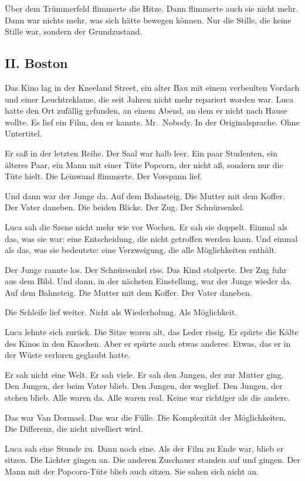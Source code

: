 \documentclass[
  ngerman,
]{article}
\begin{document}
Über dem Trümmerfeld flimmerte die Hitze. Dann flimmerte auch sie nicht
mehr. Dann war nichts mehr, was sich hätte bewegen können. Nur die
Stille, die keine Stille war, sondern der Grundzustand.

\subsection{II. Boston}\label{ii.-boston}

Das Kino lag in der Kneeland Street, ein alter Bau mit einem verbeulten
Vordach und einer Leuchtreklame, die seit Jahren nicht mehr repariert
worden war. Luca hatte den Ort zufällig gefunden, an einem Abend, an dem
er nicht nach Hause wollte. Es lief ein Film, den er kannte. Mr.~Nobody.
In der Originalsprache. Ohne Untertitel.

Er saß in der letzten Reihe. Der Saal war halb leer. Ein paar Studenten,
ein älteres Paar, ein Mann mit einer Tüte Popcorn, der nicht aß, sondern
nur die Tüte hielt. Die Leinwand flimmerte. Der Vorspann lief.

Und dann war der Junge da. Auf dem Bahnsteig. Die Mutter mit dem Koffer.
Der Vater daneben. Die beiden Blicke. Der Zug. Der Schnürsenkel.

Luca sah die Szene nicht mehr wie vor Wochen. Er sah sie doppelt. Einmal
als das, was sie war: eine Entscheidung, die nicht getroffen werden
kann. Und einmal als das, was sie bedeutete: eine Verzweigung, die alle
Möglichkeiten enthält.

Der Junge rannte los. Der Schnürsenkel riss. Das Kind stolperte. Der Zug
fuhr aus dem Bild. Und dann, in der nächsten Einstellung, war der Junge
wieder da. Auf dem Bahnsteig. Die Mutter mit dem Koffer. Der Vater
daneben.

Die Schleife lief weiter. Nicht als Wiederholung. Als Möglichkeit.

Luca lehnte sich zurück. Die Sitze waren alt, das Leder rissig. Er
spürte die Kälte des Kinos in den Knochen. Aber er spürte auch etwas
anderes. Etwas, das er in der Wüste verloren geglaubt hatte.

Er sah nicht eine Welt. Er sah viele. Er sah den Jungen, der zur Mutter
ging. Den Jungen, der beim Vater blieb. Den Jungen, der weglief. Den
Jungen, der stehen blieb. Alle waren da. Alle waren real. Keine war
richtiger als die andere.

Das war Van Dormael. Das war die Fülle. Die Komplexität der
Möglichkeiten. Die Differenz, die nicht nivelliert wird.

Luca sah eine Stunde zu. Dann noch eine. Als der Film zu Ende war, blieb
er sitzen. Die Lichter gingen an. Die anderen Zuschauer standen auf und
gingen. Der Mann mit der Popcorn-Tüte blieb auch sitzen. Sie sahen sich
nicht an.
\end{document}
